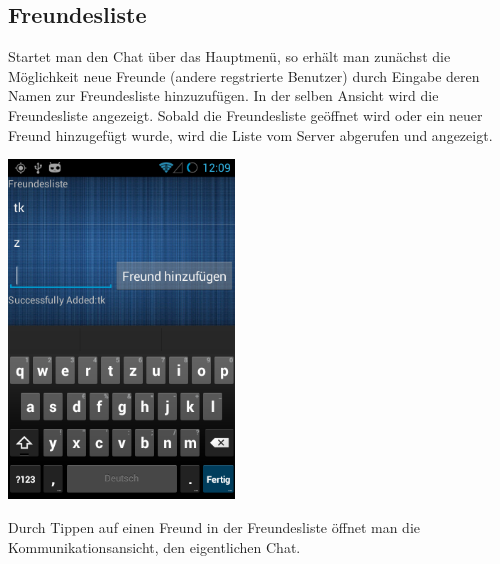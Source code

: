 \subsection{Freundesliste}
Startet man den Chat über das Hauptmenü, so erhält man zunächst die Möglichkeit neue Freunde (andere regstrierte Benutzer) durch Eingabe deren Namen zur Freundesliste hinzuzufügen. In der selben Ansicht wird die Freundesliste angezeigt. Sobald die Freundesliste geöffnet wird oder ein neuer Freund hinzugefügt wurde, wird die Liste vom Server abgerufen und angezeigt.
\begin{capfigure}
	\includegraphics[width=6cm]{images/app/friendlist}
\end{capfigure}
Durch Tippen auf einen Freund in der Freundesliste öffnet man die Kommunikationsansicht, den eigentlichen Chat.


